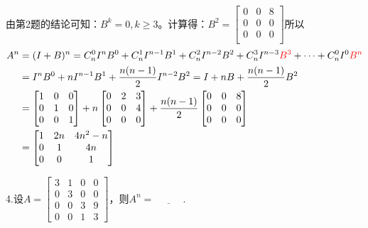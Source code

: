 \documentclass{article}
\begin{document}
\begin{jie}
由第2题的结论可知：$B^{k}=0,k\geq3$。计算得：$B^{2}=\begin{bmatrix}
                                        0 & 0&8 \\
                                       0 & 0&0 \\  0 & 0&0 \\
                                      \end{bmatrix}$所以
\begin{align*}
A^{n}&=(I+B)^{n}=C_{n}^{0}I^{n}B^{0}+C_{n}^{1}I^{n-1}B^{1}+C_{n}^{2}I^{n-2}B^{2}+C_{n}^{3}I^{n-3}\textcolor[rgb]{1.00,0.00,0.00}{B^{3}}+\cdots+C_{n}^{0}I^{0}\textcolor[rgb]{1.00,0.00,0.00}{B^{n}}\\
&=I^{n}B^{0}+nI^{n-1}B^{1}+\frac{n(n-1)}{2}I^{n-2}B^{2}=I+nB+\frac{n(n-1)}{2}B^{2}\\
&=\begin{bmatrix}
1&0&0\\
  0&1&0\\
  0&0&1\\
\end{bmatrix}+n\begin{bmatrix}
  0&2&3\\
  0&0&4\\
  0&0&0\\
\end{bmatrix}+\frac{n(n-1)}{2}
\begin{bmatrix}
                                        0 & 0&8 \\
                                       0 & 0&0 \\  0 & 0&0 \\
                                      \end{bmatrix}\\
&=
\begin{bmatrix}
  1&2n&4n^{2}-n\\
  0&1&4n\\
  0&0&1\\
\end{bmatrix}
\end{align*}
\end{jie}
  4.设$A=
  \begin{bmatrix}
 3&1&0&0\\
 0&3&0&0\\
 0&0&3&9\\
 0&0&1&3
  \end{bmatrix}
  $，则$A^{n}=\underline{~~~~~~~~~~~~~}.$
\end{document}
